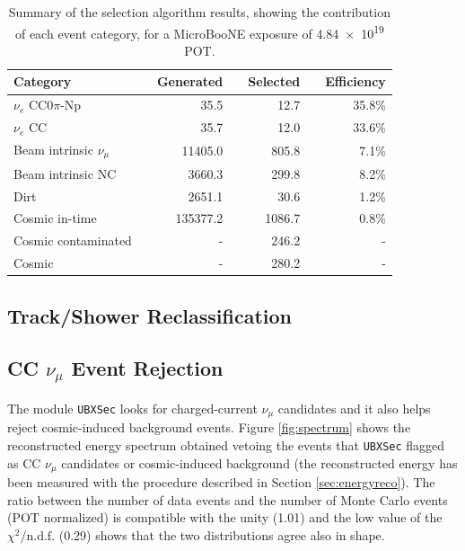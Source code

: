 \begin{table}[htbp]
   \centering
   \begin{tabular}{llrrrrr}
     \toprule
     Category & \phantom{a} & Generated & \phantom{a} & Selected & \phantom{a} & Efficiency \\
     \midrule

     $\nu_{e}$ CC0$\pi$-Np       & & 35.5     & & 12.7   & & 35.8\%\\
     $\nu_{e}$ CC                & & 35.7     & & 12.0   & & 33.6\%\\
     Beam intrinsic $\nu_{\mu}$  & & 11405.0  & & 805.8  & & 7.1\%\\
     Beam intrinsic NC           & & 3660.3   & & 299.8  & & 8.2\%\\
     Dirt                        & & 2651.1   & & 30.6   & & 1.2\%\\
     Cosmic in-time              & & 135377.2 & & 1086.7 & & 0.8\%\\
     Cosmic contaminated         & & -        & & 246.2  & & -\\
     Cosmic                      & & -        & & 280.2  & & -\\

     \bottomrule
   \end{tabular}
   \caption{Summary of the selection algorithm results, showing the contribution of each event category, for a MicroBooNE exposure of \num{4.84e19} POT.}\label{tab:result}
\end{table}

\subsection{Track/Shower Reclassification}

\subsection{CC \texorpdfstring{$\nu_{\mu}$}{numu} Event Rejection}
The module \texttt{UBXSec} \cite{ubxsec} looks for charged-current $\nu_{\mu}$ candidates and it also helps reject cosmic-induced background events.  Figure \ref{fig:spectrum} shows the reconstructed energy spectrum obtained vetoing the events that \texttt{UBXSec} flagged as CC $\nu_{\mu}$ candidates or cosmic-induced background (the reconstructed energy has been measured with the procedure described in Section \ref{sec:energyreco}). The ratio between the number of data events and the number of Monte Carlo events (POT normalized) is compatible with the unity (1.01) and the low value of the $\chi^{2} / \mathrm{n.d.f.}$ (0.29) shows that the two distributions agree also in shape.

